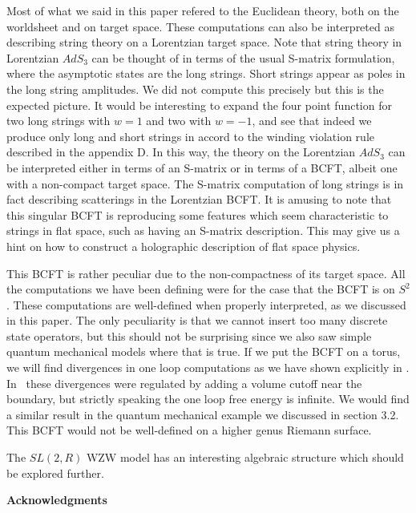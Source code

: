 
Most of what
 we said in this paper refered to the Euclidean theory, both on the
worldsheet and on target space.
These computations can also be interpreted as describing
string theory on a Lorentzian target space.
Note that string theory in Lorentzian $AdS_3$  can be thought
of in terms of the usual S-matrix formulation, where the asymptotic
states are the long strings. Short strings appear as
poles in the long string amplitudes. We did not compute this precisely
but this is the expected picture. It would be interesting to
expand the four point function for two long strings with $w=1$ and
two with $w=-1$, and see that indeed we produce only long and short
strings in accord to the winding violation rule described in the
appendix D. In this way,
the theory on the Lorentzian $AdS_3$ can be interpreted either in terms
of an S-matrix or in terms of a BCFT, albeit one with a non-compact
target space. The S-matrix computation of long strings is
in fact describing scatterings in the Lorentzian BCFT. It
is amusing to note that
this singular BCFT is reproducing some features which seem characteristic
to strings in flat space, such as
 having an S-matrix description. This may give us a
hint on how to construct a holographic description of flat
space physics.


This BCFT is rather peculiar due to the non-compactness of its
target space. All the computations we have been defining were for the
case that the BCFT is on $S^2$. These computations are well-defined when
properly interpreted, as we discussed in this paper. The only peculiarity
is that we cannot insert too many discrete state operators, but this
should not be surprising since we also saw simple quantum mechanical
models where that is true.
If we put the BCFT on a torus, we will find divergences in one
loop computations as we have shown explicitly in \second .
In \second\ these divergences were regulated by adding a volume cutoff
near the boundary, but strictly speaking the one loop free energy is
infinite. We would find a similar result in the quantum mechanical example
we discussed in section 3.2.
This BCFT would not be well-defined on a higher genus Riemann
surface.

The $SL(2,R)$ WZW model has an interesting algebraic structure which
should be explored further.



\bigskip
\bigskip

\centerline{{\bf Acknowledgments }}

